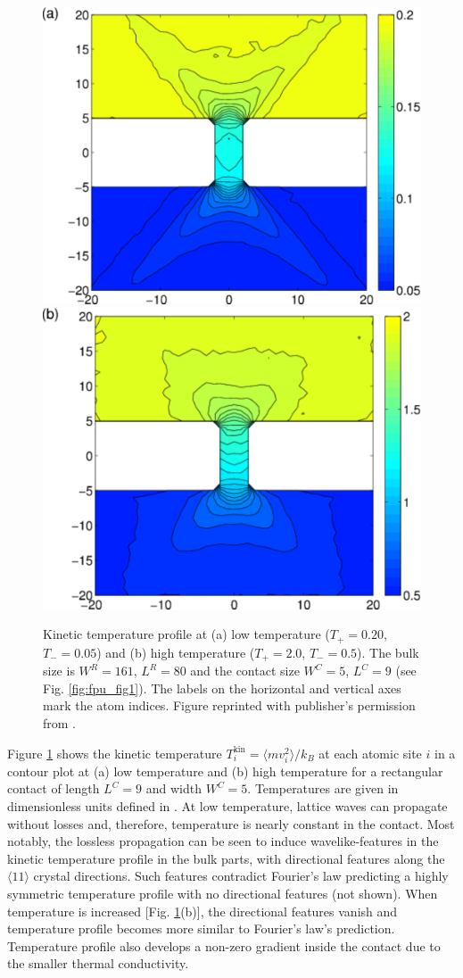 \begin{figure}
\begin{center}
 \includegraphics[width=.49\columnwidth]{pics/fpu_fig2a.pdf}
  \includegraphics[width=.49\columnwidth]{pics/fpu_fig2b.pdf}
 \caption{Kinetic temperature profile at (a) low temperature ($T_+=0.20$, $T_-=0.05$) and (b) high temperature ($T_+=2.0$, $T_-=0.5$). The bulk size is $W^R=161$, $L^R=80$ and the contact size $W^C=5$, $L^C=9$ (see Fig. \ref{fig:fpu_fig1}). The labels on the horizontal and vertical axes mark the atom indices. Figure reprinted with publisher's permission from .}
\label{fig:fpu_fig2}
\end{center}
\end{figure}

Figure \ref{fig:fpu_fig2} shows the kinetic temperature $T_i^{\textrm{kin}}=\langle mv_i^2 \rangle/k_B$ at each atomic site $i$ in a contour plot at (a) low temperature and (b) high temperature for a rectangular contact of length $L^C=9$ and width $W^C=5$. Temperatures are given in dimensionless units defined in . At low temperature, lattice waves can propagate without losses and, therefore, temperature is nearly constant in the contact. Most notably, the lossless propagation can be seen to induce wavelike-features in the kinetic temperature profile in the bulk parts, with directional features along the $\langle 11 \rangle$ crystal directions. Such features contradict Fourier's law predicting a highly symmetric temperature profile with no directional features (not shown). When temperature is increased [Fig. \ref{fig:fpu_fig2}(b)], the directional features vanish and temperature profile becomes more similar to Fourier's law's prediction. Temperature profile also develops a non-zero gradient inside the contact due to the smaller thermal conductivity.


